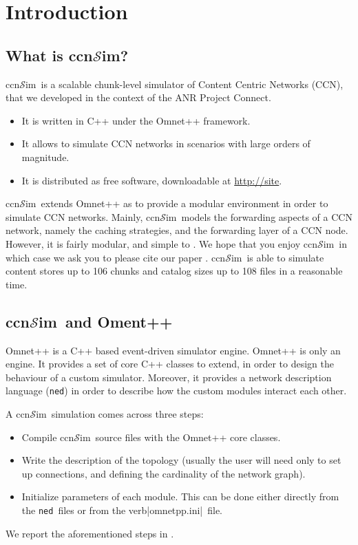 \documentclass{article}
\newcommand{\ccnsim}{ccn$\mathcal{S}$im}
\newcommand{\ned}{\texttt{ned}}
\newcommand{\ini}{verb|omnetpp.ini|}
\begin{document}
\tableofcontents
\newpage
\section{Introduction}
\subsection{What is \ccnsim?}
\ccnsim\ is a scalable chunk-level simulator of Content Centric Networks (CCN)\cite{jacobson09conext}, that we developed in the context of the ANR Project Connect.  

\begin{itemize}
    \item It is written in C++ under the Omnet++ framework.
    \item It  allows to simulate CCN networks in scenarios with large orders of magnitude.
    \item It is distributed as free software, downloadable at \url{http://site}.
\end{itemize}
\ccnsim\ extends Omnet++ as to provide a modular environment in order to simulate CCN networks. Mainly,  \ccnsim\ models the forwarding aspects of a CCN network, namely the caching strategies, and the forwarding layer of a CCN node. However, it is fairly modular, and simple to . We hope that you enjoy \ccnsim\, in which case we ask you to please cite our paper \cite{ccn12icc}. 
\ccnsim\ is able to simulate content stores up to 106 chunks and catalog sizes up to 108 files in a reasonable time.  
\subsection{\ccnsim\ and Oment++}
Omnet++ is a C++ based event-driven simulator engine. Omnet++ is only an engine. It provides a set of core C++ classes to extend, in order to design the behaviour of a custom simulator. 
Moreover, it provides a network description language (\verb|ned|) in order to describe how the custom modules interact each other. 

A \ccnsim\ simulation comes across three steps:
\begin{itemize}
    \item Compile \ccnsim\ source files with the Omnet++ core classes.
    \item Write the description of the topology (usually the user will need only to set up connections, and defining the cardinality of the network graph).
    \item Initialize parameters of each module. This can be done either directly from the \ned\ files or from the \ini\ file. 
\end{itemize}
We report the aforementioned steps in .
\end{document}
